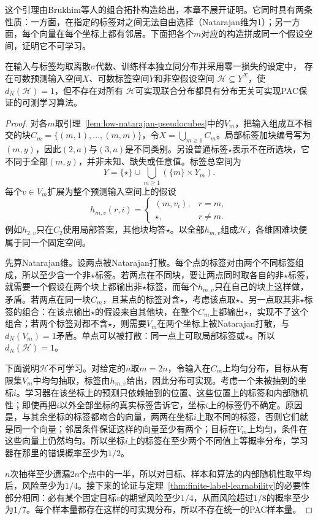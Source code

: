 这个引理由Brukhim等人的组合拓扑构造给出，本章不展开证明。它同时具有两条性质：一方面，在指定的标签对之间无法自由选择（Natarajan维为1）；另一方面，每个向量在每个坐标上都有邻居。下面把各个$m$对应的构造拼成同一个假设空间，证明它不可学习。

\begin{theorem}[无限标签下有限Natarajan维并不充分]
\label{thm:natarajan-infinite-counterexample}
在输入与标签均取离散$\sigma$代数、训练样本独立同分布并采用零一损失的设定中，
存在可数预测输入空间$X$、可数标签空间$Y$和非空假设空间
$\mathcal H\subseteq Y^X$，使$d_N(\mathcal H)=1$，但不存在对所有
$\mathcal H$可实现联合分布都具有分布无关可实现PAC保证的可测学习算法。
\end{theorem}

\begin{proof}
对各$m$取引理~\ref{lem:low-natarajan-pseudocubes}中的$V_m$，把输入组成互不相交的块$C_m=\{(m,1),\ldots,(m,m)\}$，令$X=\bigcup_{m\geq1}C_m$。局部标签加块编号写为$(m,y)$，因此$(2,a)$与$(3,a)$是不同类别。另设普通标签$\star$表示不在所选块，它不同于全部$(m,y)$，并非未知、缺失或任意值。标签总空间为
\[
 Y=\{\star\}\cup\bigcup_{m\geq1}(\{m\}\times Y_m).
\]
每个$v\in V_m$扩展为整个预测输入空间上的假设
\[
 h_{m,v}(r,i)=
 \begin{cases}
 (m,v_i),&r=m,\\
 \star,&r\neq m.
 \end{cases}
\]
例如$h_{2,v}$只在$C_2$使用局部答案，其他块均答$\star$。以全部$h_{m,v}$组成$\mathcal H$，各维困难块便属于同一个固定空间。

先算Natarajan维。设两点被Natarajan打散。每个点的标签对由两个不同标签组成，所以至少含一个非$\star$标签。若两点在不同块，要让两点同时取各自的非$\star$标签，就需要一个假设在两个块上都输出非$\star$标签，而每个$h_{m,v}$只在自己的块上这样做，矛盾。若两点在同一块$C_m$，且某点的标签对含$\star$，考虑该点取$\star$、另一点取其非$\star$标签的组合：在该点输出$\star$的假设来自其他块，在整个$C_m$上都输出$\star$，实现不了这个组合；若两个标签对都不含$\star$，则需要$V_m$在两个坐标上被Natarajan打散，与$d_N(V_m)=1$矛盾。单点可以被打散：同一点上可取局部标签或$\star$。所以$d_N(\mathcal H)=1$。

下面说明$\mathcal H$不可学习。对给定的$n$取$m=2n$，令输入在$C_m$上均匀分布，目标从有限集$V_m$中均匀抽取，标签由$h_{m,v}$给出，因此分布可实现。考虑一个未被抽到的坐标$i$。学习器在该坐标上的预测只依赖抽到的位置、这些位置上的标签和内部随机性；即使再把$i$以外全部坐标的真实标签告诉它，坐标$i$上的标签仍不确定。原因是，与其余坐标的标签都吻合的向量，两两在坐标$i$上取不同的标签，否则它们就是同一个向量；邻居条件保证这样的向量至少有两个；目标在$V_m$上均匀，条件在这些向量上仍然均匀。所以坐标$i$上的标签在至少两个不同值上等概率分布，学习器在那里的错误概率至少为$1/2$。

$n$次抽样至少遗漏$2n$个点中的一半，所以对目标、样本和算法的内部随机性取平均后，风险至少为$1/4$。接下来的论证与定理~\ref{thm:finite-label-learnability}的必要性部分相同：必有某个固定目标$v$的期望风险至少$1/4$，从而风险超过$1/8$的概率至少为$1/7$。每个样本量都存在这样的可实现分布，所以不存在统一的PAC样本量。
\end{proof}

